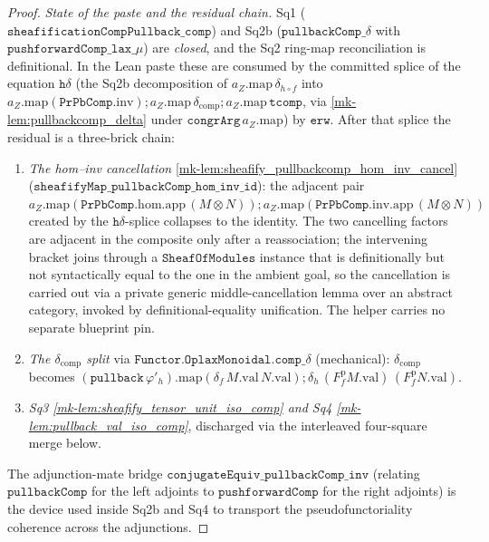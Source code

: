 \begin{proof}
  \emph{State of the paste and the residual chain.} Sq1 (\(\mathtt{sheafificationCompPullback\_comp}\))
  and Sq2b (\(\mathtt{pullbackComp\_}\delta\) with \(\mathtt{pushforwardComp\_lax\_}\mu\)) are
  \emph{closed}, and the Sq2 ring-map reconciliation is definitional. In the Lean paste these are
  consumed by the committed splice of the equation \(\mathtt{h}\delta\) (the Sq2b decomposition of
  \(a_Z.\mathrm{map}\,\delta_{h\circ f}\) into
  \(a_Z.\mathrm{map}(\mathtt{PrPbComp}.\mathrm{inv}) \mathbin{;} a_Z.\mathrm{map}\,\delta_{\mathrm{comp}}
  \mathbin{;} a_Z.\mathrm{map}\,\mathtt{tcomp}\), via \ref{mk-lem:pullbackcomp_delta} under
  \(\mathtt{congrArg}\,a_Z.\mathrm{map}\)) by \(\mathtt{erw}\). After that splice the residual is a
  three-brick chain:
  \begin{enumerate}
    \item[(i)] \emph{The hom--inv cancellation} \ref{mk-lem:sheafify_pullbackcomp_hom_inv_cancel}
      (\(\mathtt{sheafifyMap\_pullbackComp\_hom\_inv\_id}\)): the adjacent pair
      \(a_Z.\mathrm{map}(\mathtt{PrPbComp}.\mathrm{hom}.\mathrm{app}\,(M\otimes N)) \mathbin{;}
      a_Z.\mathrm{map}(\mathtt{PrPbComp}.\mathrm{inv}.\mathrm{app}\,(M\otimes N))\) created by the
      \(\mathtt{h}\delta\)-splice collapses to the identity. The two cancelling
      factors are adjacent in the composite only after a reassociation; the intervening bracket
      joins through a \(\mathtt{SheafOfModules}\) instance that is definitionally but not
      syntactically equal to the one in the ambient goal, so the cancellation is carried out via
      a private generic middle-cancellation lemma over an abstract category, invoked by
      definitional-equality unification. The helper carries no separate blueprint pin.
    \item[(ii)] \emph{The \(\delta_{\mathrm{comp}}\) split} via
      \(\mathtt{Functor.OplaxMonoidal.comp\_}\delta\) (mechanical): \(\delta_{\mathrm{comp}}\)
      becomes \((\mathtt{pullback}\,\varphi'_h).\mathrm{map}(\delta_f\,M.\mathrm{val}\,N.\mathrm{val})
      \mathbin{;} \delta_h\,(F^{\mathrm p}_f M.\mathrm{val})\,(F^{\mathrm p}_f N.\mathrm{val})\).
    \item[(iii)] \emph{Sq3 \ref{mk-lem:sheafify_tensor_unit_iso_comp} and Sq4
      \ref{mk-lem:pullback_val_iso_comp}}, discharged via the interleaved four-square merge below.
  \end{enumerate}
  The adjunction-mate bridge \(\mathtt{conjugateEquiv\_pullbackComp\_inv}\) (relating
  \(\mathtt{pullbackComp}\) for the left adjoints to \(\mathtt{pushforwardComp}\) for the
  right adjoints) is the device used inside Sq2b and Sq4 to transport the pseudofunctoriality
  coherence across the adjunctions.


\end{proof}
